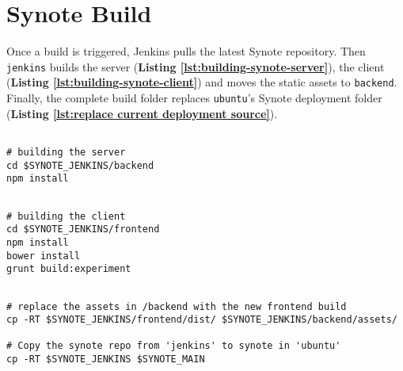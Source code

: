 \section{Synote Build}
\label{sec:synote-build}

Once a build is triggered, Jenkins pulls the latest Synote repository. Then \texttt{jenkins} builds the server (\textbf{Listing \ref{lst:building-synote-server}}), the client (\textbf{Listing \ref{lst:building-synote-client}}) and moves the static assets to \texttt{backend}. Finally, the complete build folder replaces \texttt{ubuntu}'s Synote deployment folder (\textbf{Listing \ref{lst:replace current deployment source}}).\\

\begin{listing}[H]
\begin{verbatim}

# building the server
cd $SYNOTE_JENKINS/backend
npm install

\end{verbatim}
\label{lst:building-synote-server}
\end{listing}

\begin{listing}[H]
\begin{verbatim}

# building the client
cd $SYNOTE_JENKINS/frontend
npm install
bower install
grunt build:experiment

\end{verbatim}
\label{lst:building-synote-client}
\end{listing}

\begin{listing}[H]
\begin{verbatim}

# replace the assets in /backend with the new frontend build
cp -RT $SYNOTE_JENKINS/frontend/dist/ $SYNOTE_JENKINS/backend/assets/

# Copy the synote repo from 'jenkins' to synote in 'ubuntu'
cp -RT $SYNOTE_JENKINS $SYNOTE_MAIN

\end{verbatim}
\label{lst:replace current deployment source}
\end{listing}

